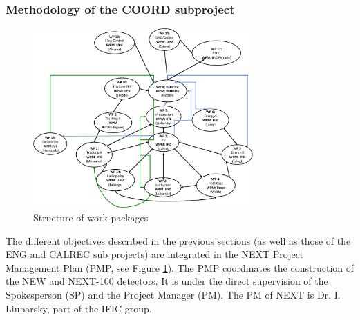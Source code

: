 %
%

\subsubsection*{Methodology of the COORD subproject}


\begin{figure}[h!]
\begin{center}
\includegraphics[width=0.75\textwidth]{img/PMP.pdf}
\end{center}
\caption{\label{Fig:PMP}Structure of work packages}
\end{figure}
%

The different objectives described in the previous sections (as well as those of the ENG and CALREC sub projects) are integrated in the NEXT Project Management Plan (PMP, see Figure \ref{Fig:PMP}). 
The PMP coordinates the construction of the NEW and NEXT-100 detectors. It is under the direct supervision of the Spokesperson (SP) and the Project Manager (PM). The PM of NEXT is Dr. I. Liubarsky, part of the IFIC group.

